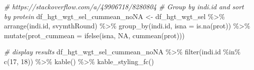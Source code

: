 \documentclass[
]{book}
\newenvironment{Shaded}{\begin{snugshade}}{\end{snugshade}}
\newcommand{\AttributeTok}[1]{\textcolor[rgb]{0.77,0.63,0.00}{#1}}
\newcommand{\CommentTok}[1]{\textcolor[rgb]{0.56,0.35,0.01}{\textit{#1}}}
\newcommand{\ConstantTok}[1]{\textcolor[rgb]{0.00,0.00,0.00}{#1}}
\newcommand{\DecValTok}[1]{\textcolor[rgb]{0.00,0.00,0.81}{#1}}
\newcommand{\FunctionTok}[1]{\textcolor[rgb]{0.00,0.00,0.00}{#1}}
\newcommand{\NormalTok}[1]{#1}
\newcommand{\OtherTok}[1]{\textcolor[rgb]{0.56,0.35,0.01}{#1}}
\newcommand{\SpecialCharTok}[1]{\textcolor[rgb]{0.00,0.00,0.00}{#1}}
\begin{document}
\begin{Shaded}
\begin{Highlighting}[]
\CommentTok{\# https://stackoverflow.com/a/49906718/8280804}
\CommentTok{\# Group by indi.id and sort by protein}
\NormalTok{df\_hgt\_wgt\_sel\_cummean\_noNA }\OtherTok{\textless{}{-}}\NormalTok{ df\_hgt\_wgt\_sel }\SpecialCharTok{\%\textgreater{}\%}
  \FunctionTok{arrange}\NormalTok{(indi.id, svymthRound) }\SpecialCharTok{\%\textgreater{}\%}
  \FunctionTok{group\_by}\NormalTok{(indi.id, }\AttributeTok{isna =} \FunctionTok{is.na}\NormalTok{(prot)) }\SpecialCharTok{\%\textgreater{}\%}
  \FunctionTok{mutate}\NormalTok{(}\AttributeTok{prot\_cummean =} \FunctionTok{ifelse}\NormalTok{(isna, }\ConstantTok{NA}\NormalTok{, }\FunctionTok{cummean}\NormalTok{(prot)))}

\CommentTok{\# display results}
\NormalTok{df\_hgt\_wgt\_sel\_cummean\_noNA }\SpecialCharTok{\%\textgreater{}\%} \FunctionTok{filter}\NormalTok{(indi.id }\SpecialCharTok{\%in\%} \FunctionTok{c}\NormalTok{(}\DecValTok{17}\NormalTok{, }\DecValTok{18}\NormalTok{)) }\SpecialCharTok{\%\textgreater{}\%} 
  \FunctionTok{kable}\NormalTok{() }\SpecialCharTok{\%\textgreater{}\%} \FunctionTok{kable\_styling\_fc}\NormalTok{()}
\end{Highlighting}
\end{Shaded}
\end{document}
